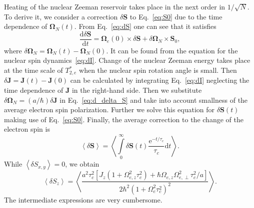 \documentclass[prl,nobibnotes,twocolumn,aps,longbibliography,superscriptaddress,notoc]{revtex4-1}
\newcommand{\e}{\mathrm{e}}
\renewcommand{\d}{\mathrm d}
\newcommand{\braket}[1]{\left\langle #1 \right\rangle}
\begin{document}
Heating of the nuclear Zeeman reservoir takes place in the next order in $1/\sqrt{N}$. To derive it, we consider a correction $\delta\bm S$ to Eq.~\eqref{eq:S0} due to the time dependence of $\bm\Omega_N(t)$. From Eq.~\eqref{eq:dS} one can see that it satisfies
\begin{equation}
  \label{eq:d_delta_S}
  \frac{\d\delta\bm S}{\d t}=\bm\Omega_e(0)\times\delta\bm S+\delta\bm\Omega_N\times\bm S_0,
\end{equation}
where $\delta\bm\Omega_N=\bm\Omega_N(t)-\bm\Omega_N(0)$. It can be found from the equation for the nuclear spin dynamics~\eqref{eq:dI}. Change of the nuclear Zeeman energy takes place at the time scale of $T_{2,e}^*$ when the nuclear spin rotation angle is small. Then $\delta\bm J=\bm J(t)-\bm J(0)$ can be calculated by integrating Eq.~\eqref{eq:dI} neglecting the time dependence of $\bm J$ in the right-hand side. Then we substitute $\delta\bm\Omega_N=(a/\hbar)\delta\bm J$ in Eq.~\eqref{eq:d_delta_S} and take into account smallness of the average electron spin polarization. Further we solve this equation for $\delta\bm S(t)$ making use of Eq.~\eqref{eq:S0}. Finally, the average correction to the change of the electron spin is
\begin{equation}
  \braket{\delta\bm S}=\braket{\int\limits_0^\infty\delta\bm S(t)\frac{\e^{-t/\tau_c}}{\tau_c}\d t}.
\end{equation}
While $\braket{\delta S_{x,y}}=0$, we obtain
\begin{equation}
  \label{eq:delta_S1}
  \braket{\delta S_z}=\braket{\frac{a^2\tau_c^2\left[J_z\left(1+\Omega_{e,z}^2\tau_c^2\right)+\hbar\Omega_{e,z}\Omega_{e,\perp}^2\tau_c^2/a\right]}{2\hbar^2\left(1+\Omega_e^2\tau_c^2\right)^2}}.
\end{equation}
The intermediate expressions are very cumbersome.
\end{document}
